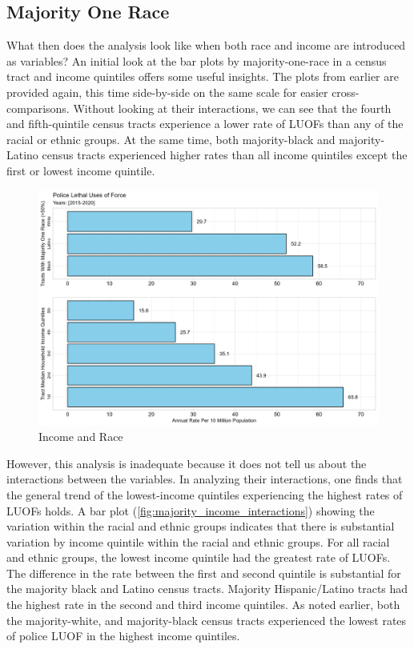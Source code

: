 \documentclass[12pt]{article}
\begin{document}
\subsection{Majority One Race}

What then does the analysis look like when both race and income are introduced as variables? An initial look at the bar plots by majority-one-race in a census tract and income quintiles offers some useful insights. The plots from earlier are provided again, this time side-by-side on the same scale for easier cross-comparisons. Without looking at their interactions, we can see that the fourth and fifth-quintile census tracts experience a lower rate of LUOFs than any of the racial or ethnic groups. At the same time, both majority-black and majority-Latino census tracts experienced higher rates than all income quintiles except the first or lowest income quintile.

\begin{figure}[H]
  \centering %
  \includegraphics[width=\linewidth]{images/combined}
  \captionsetup{justification=centering, singlelinecheck=false, margin=2cm}
  \caption[Income and Race]{Income and Race}
  \label{fig:combined}
\end{figure}

However, this analysis is inadequate because it does not tell us about the interactions between the variables. In analyzing their interactions, one finds that the general trend of the lowest-income quintiles experiencing the highest rates of LUOFs holds. A bar plot (\autoref{fig:majority_income_interactions}) showing the variation within the racial and ethnic groups indicates that there is substantial variation by income quintile within the racial and ethnic groups. For all racial and ethnic groups, the lowest income quintile had the greatest rate of LUOFs. The difference in the rate between the first and second quintile is substantial for the majority black and Latino census tracts. Majority Hispanic/Latino tracts had the highest rate in the second and third income quintiles. As noted earlier, both the majority-white, and majority-black census tracts experienced the lowest rates of police LUOF in the highest income quintiles.
\end{document}
